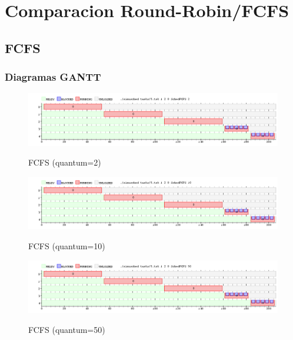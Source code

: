 \section{Comparacion Round-Robin/FCFS}

\subsection{FCFS}

\subsubsection{Diagramas GANTT}
\begin{figure}[h]
    \includegraphics[width=\linewidth]{images/6_quantum2.png}
    \label{fig:Task Consola}
    \caption{FCFS (quantum=2)}
\end{figure}

\begin{figure}[h]
    \includegraphics[width=\linewidth]{images/6_quantum10.png}
    \label{fig:Task Consola}
    \caption{FCFS (quantum=10)}
\end{figure}

\begin{figure}[h]
    \includegraphics[width=\linewidth]{images/6_quantum50.png}
    \label{fig:Task Consola}
    \caption{FCFS (quantum=50)}
\end{figure}
